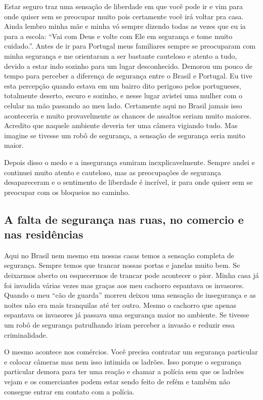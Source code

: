 \documentclass[12pt,a4paper]{article}
\begin{document}
    Estar seguro traz uma sensação de liberdade em que você pode ir e vim para onde quiser sem se preocupar muito pois certamente você irá voltar pra casa. Ainda lembro minha mãe e minha vó sempre dizendo todas as vezes que eu ia para a escola: “Vai com Deus e volte com Ele em segurança e tome muito cuidado.”. Antes de ir para Portugal meus familiares sempre se preocuparam com minha segurança e me orientaram a ser bastante cauteloso e atento a tudo, devido a estar indo sozinho para um lugar desconhecido. Demorou um pouco de tempo para perceber a diferença de segurança entre o Brasil e Portugal. Eu tive esta percepção quando estava em um bairro dito perigoso pelos portugueses, totalmente deserto, escuro e sozinho, e nesse lugar avistei uma mulher com o celular na mão passando ao meu lado. Certamente aqui no Brasil jamais isso aconteceria e muito provavelmente as chances de assaltos seriam muito maiores. Acredito que naquele ambiente deveria ter uma câmera vigiando tudo. Mas imagine se tivesse um robô de segurança, a sensação de segurança seria muito maior.

    Depois disso o medo e a insegurança sumiram inexplicavelmente. Sempre andei e continuei muito atento e cauteloso, mas as preocupações de segurança desapareceram e o sentimento de liberdade é incrível, ir para onde quiser sem se preocupar com os bloqueios no caminho.

    \subsection{A falta de segurança nas ruas, no comercio e nas residências}
    Aqui no Brasil nem mesmo em nossas casas temos a sensação completa de segurança. Sempre temos que trancar nossas portas e janelas muito bem. Se deixarmos aberto ou esquecermos de trancar pode acontecer o pior. Minha casa já foi invadida várias vezes mas graças aos meu cachorro espantava os invasores. Quando o meu “cão de guarda” morreu deixou uma sensação de insegurança e as noites não era mais tranquilas até ter outro. Mesmo o cachorro que apenas espantava os invasores já passava uma segurança maior no ambiente. Se tivesse um robô de segurança patrulhando iriam perceber a invasão e reduzir essa criminalidade. 

    O mesmo acontece nos comércios. Você precisa contratar um segurança particular e colocar câmeras mas nem isso intimida os ladrões. Isso porque o segurança particular demora para ter uma reação e chamar a polícia sem que os ladrões vejam e os comerciantes podem estar sendo feito de refém e também não consegue entrar em contato com a polícia.
\end{document}
